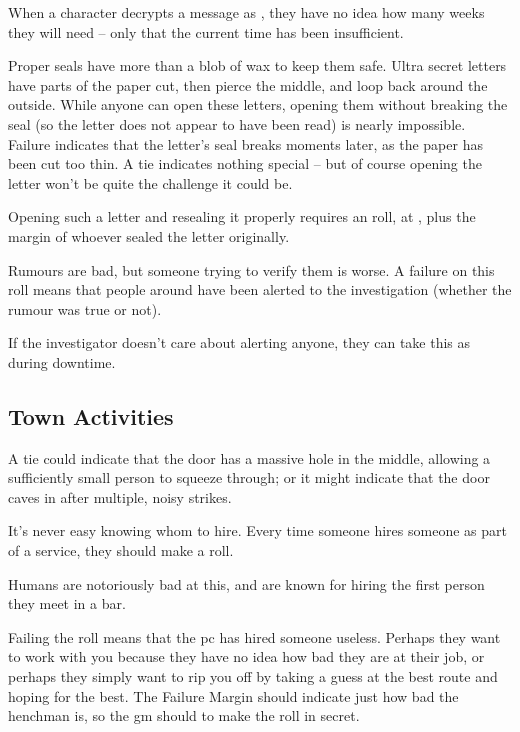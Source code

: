 \begin{multicols}{2}
When a character decrypts a message as , they have no idea how many weeks they will need -- only that the current time has been insufficient.

Proper seals have more than a blob of wax to keep them safe.
Ultra secret letters have parts of the paper cut, then pierce the middle, and loop back around the outside.
While anyone can open these letters, opening them without breaking the seal (so the letter does not appear to have been read) is nearly impossible.
Failure indicates that the letter's seal breaks moments later, as the paper has been cut too thin.
A tie indicates nothing special -- but of course opening the letter won't be quite the challenge it could be.

Opening such a letter and resealing it properly requires an  roll, at \tn[14], plus the margin of whoever sealed the letter originally.

Rumours are bad, but someone trying to verify them is worse.
A failure on this roll means that people around have been alerted to the investigation (whether the rumour was true or not).

If the investigator doesn't care about alerting anyone, they can take this as  during \gls{downtime}.

\subsection{Town Activities}

A tie could indicate that the door has a massive hole in the middle, allowing a sufficiently small person to squeeze through; or it might indicate that the door caves in after multiple, noisy strikes.

It's never easy knowing whom to hire.
Every time someone hires someone as part of a service, they should make a roll.

Humans are notoriously bad at this, and are known for hiring the first person they meet in a bar.

Failing the roll means that the \gls{pc} has hired someone useless.
Perhaps they want to work with you because they have no idea how bad they are at their job, or perhaps they simply want to rip you off by taking a guess at the best route and hoping for the best.
The Failure Margin should indicate just how bad the henchman is, so the \gls{gm} should to make the roll in secret.


\end{multicols}
